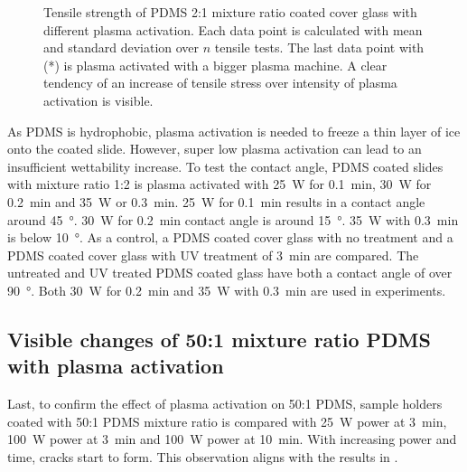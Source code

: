 \begin{figure}[hbt!]
	\centering
	
	\caption{Tensile strength of PDMS 2:1 mixture ratio coated cover glass with different plasma activation. Each data point is calculated with mean and standard deviation over $n$ tensile tests. The last data point with (*) is plasma activated with a bigger plasma machine. A clear tendency of an increase of tensile stress over intensity of plasma activation is visible.}
	\label{fig:PlotPlasmaAktivierung}
\end{figure}

As PDMS is hydrophobic, plasma activation is needed to freeze a thin layer of ice onto the coated slide. However, super low plasma activation can lead to an insufficient wettability increase. To test the contact angle,  PDMS coated slides with mixture ratio 1:2 is plasma activated with \SI{25}{\watt} for \SI{0.1}{\minute}, \SI{30}{\watt} for \SI{0.2}{\minute} and \SI{35}{\watt} or \SI{0.3}{\minute}. \SI{25}{\watt} for \SI{0.1}{\minute} results in a contact angle around \SI{45}{\degree}. \SI{30}{\watt} for \SI{0.2}{\minute} contact angle is around \SI{15}{\degree}. \SI{35}{\watt} with \SI{0.3}{\minute} is below \SI{10}{\degree}. As a control, a PDMS coated cover glass with no treatment and a PDMS coated cover glass with UV treatment of \SI{3}{\minute} are compared. The untreated and UV treated PDMS coated glass have both a contact angle of over \SI{90}{\degree}. Both \SI{30}{\watt} for \SI{0.2}{\minute} and \SI{35}{\watt} with \SI{0.3}{\minute} are used in experiments.

\subsection{Visible changes of 50:1 mixture ratio PDMS with plasma activation}

Last, to confirm the effect of plasma activation on 50:1 PDMS, sample holders coated with 50:1 PDMS mixture ratio is compared with \SI{25}{\watt} power at \SI{3}{\minute}, \SI{100}{\watt} power at \SI{3}{\minute} and \SI{100}{\watt} power at \SI{10}{\minute}. With increasing power and time, cracks start to form. This observation aligns with the results in \cite{Ohishi.2017}.

